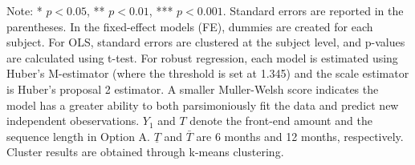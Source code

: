 \documentclass[12pt]{article}
\begin{document}
\begin{table}
    \vspace*{4pt}
    \centering
    \begin{minipage}{0.85\textwidth}
    {\par\footnotesize Note: * $p<0.05$, ** $p<0.01$, *** $p<0.001$. Standard errors are reported in the parentheses. In the fixed-effect models (FE), dummies are created for each subject. For OLS, standard errors are clustered at the subject level, and p-values are calculated using t-test. For robust regression, each model is estimated using Huber's M-estimator (where the threshold is set at 1.345) and the scale estimator is Huber's proposal 2 estimator. A smaller Muller-Welsh score indicates the model has a greater ability to both parsimoniously fit the data and predict new independent obeservations. $Y_1$ and $T$ denote the front-end amount and the sequence length in Option A. $\underline{T}$ and $\bar{T}$ are 6 months and 12 months, respectively. Cluster results are obtained through k-means clustering.}
    \end{minipage}
    \label{tab:baseline}
\end{table}
\end{document}
